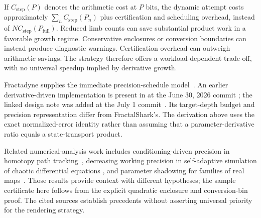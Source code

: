 If $C_{\mathrm{step}}(P)$ denotes the arithmetic cost at $P$ bits, the dynamic
attempt costs approximately
$\sum_n C_{\mathrm{step}}(P_n)$ plus certification and scheduling overhead,
instead of $N C_{\mathrm{step}}(P_{\mathrm{full}})$. Reduced limb counts can
save substantial product work in a favorable growth regime. Conservative
enclosures or conversion boundaries can instead produce diagnostic warnings.
Certification overhead can outweigh arithmetic savings. The strategy
therefore offers a workload-dependent trade-off, with no universal speedup
implied by derivative growth.

Fractadyne supplies the immediate precision-schedule model~\cite{Fractadyne}.
An earlier derivative-driven implementation is present in
 at the June 30, 2026 commit
\cite{Collombet2026Precision}; the linked design note was added at the July 1
commit~\cite{Collombet2026PrecisionDesign}. Its target-depth budget and
precision representation differ from FractalShark's. The derivation above
uses the exact normalized-error identity rather than assuming that a
parameter-derivative ratio equals a state-transport product.

Related numerical-analysis work includes conditioning-driven precision in
homotopy path tracking~\cite{Bates2008AdaptivePrecision}, decreasing working
precision in self-adaptive simulation of chaotic differential equations
\cite{QinLiao2023AdaptiveCNS}, and parameter shadowing for families of real
maps~\cite{NusseYorke1988Shadowing}. Those results provide context with
different hypotheses; the sample certificate here follows from the explicit
quadratic enclosure and conversion-bin proof. The cited sources establish
precedents without asserting universal priority for the rendering strategy.
